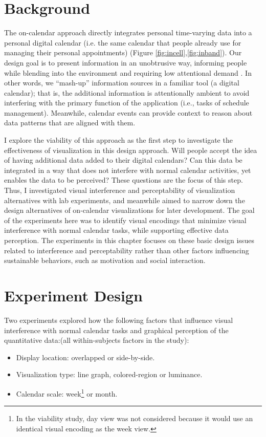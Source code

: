 \documentclass[12pt,oneside]{book}
\begin{document}
\section{Background}
The on-calendar approach directly integrates personal time-varying data into a personal digital calendar (i.e. the same calendar that people already use for managing their personal appointments) (Figure \ref{fig:incell},\ref{fig:inband}).  Our design goal is to present information in an unobtrusive way, informing people while blending into the environment and requiring low attentional demand \cite{moere_towards_2007}.  In other words, we ``mash-up'' information sources in a familiar tool (a digital calendar); that is, the additional information is attentionally ambient to avoid interfering with the primary function of the application (i.e., tasks of schedule management). Meanwhile, calendar events can provide context to reason about data patterns that are aligned with them. 

I explore the viability of this approach as the first step to investigate the effectiveness of visualization in this design approach.  Will people accept the idea of having additional data added to their digital calendars?  Can this data be integrated in a way that does not interfere with normal calendar activities, yet enables the data to be perceived? These questions are the focus of this step.  Thus, I investigated visual interference and perceptability of visualization alternatives with lab experiments, and meanwhile aimed to narrow down the design alternatives of on-calendar visualizations for later development. The goal of the experiments here was to identify visual encodings that minimize visual interference with normal calendar tasks, while supporting effective data perception. The experiments in this chapter focuses on these basic design issues related to interference and perceptability rather than other factors influencing sustainable behaviors, such as motivation and social interaction.

\section{Experiment Design}
\label{experiment:design}
Two experiments explored how the following factors that influence visual interference with normal calendar tasks and graphical perception of the quantitative data:(all within-subjects factors in the study):
\begin{itemize}
 \item Display location: overlapped or side-by-side.
 \item Visualization type: line graph, colored-region or luminance. 
 \item Calendar scale: week\footnote{In the viability study, day view was not considered because it would use an identical visual encoding as the week view.}  or month.
\end{itemize}
\end{document}
